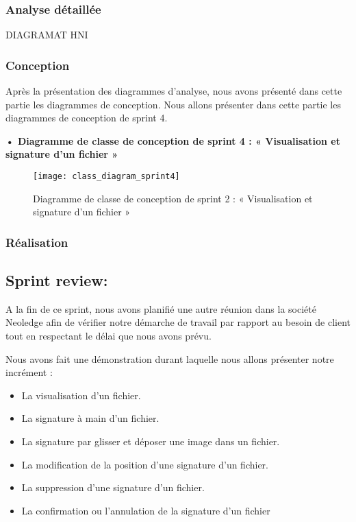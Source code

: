 \subsubsection{Analyse détaillée}

DIAGRAMAT HNI 

\subsubsection{Conception}

Après la présentation des diagrammes d'analyse, nous avons présenté dans cette partie les diagrammes de conception.
Nous allons présenter dans cette partie les diagrammes de conception de sprint 4.

\textbf{•	Diagramme de classe de conception de sprint 4 : « Visualisation et signature
d'un fichier »}

\begin{figure}[H]
  \centering
  \texttt{[image: class\_diagram\_sprint4]}
  \caption{Diagramme de classe de conception de sprint 2 : « Visualisation et signature
  d'un fichier »}
  \label{fig:ClassDiagramSprint4}
\end{figure}

\subsubsection{Réalisation}

\subsection{Sprint review:}


A la fin de ce sprint, nous avons planifié une autre réunion dans la société Neoledge  afin de vérifier notre démarche de travail par rapport au besoin de client tout en respectant le délai que nous avons prévu.

Nous avons fait une démonstration durant laquelle nous allons présenter notre incrément :
\begin{itemize}
  \item La visualisation d'un fichier.
  \item La signature à main d'un fichier.
  \item La signature par glisser et déposer une image dans un fichier.
  \item La modification de la position d'une signature d'un fichier.
  \item La suppression d'une signature d'un fichier.
  \item La confirmation ou l'annulation de la signature d'un fichier
\end{itemize}

